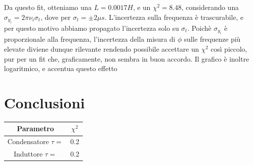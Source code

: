 Da questo fit, otteniamo una $L=0.0017 H$, e un $\chi^2 = 8.48 $, considerando una $\sigma_{y_i} = 2 \pi \nu_i \sigma_{t}$, dove  per $\sigma_t = \pm 2 \mu s$. L'incertezza sulla frequenza è trascurabile, e per questo motivo abbiamo propagato l'incertezza solo su $\sigma_t$. Poichè $\sigma_{y_i}$ è proporzionale alla frequenza, l'incertezza della misura di $\phi$ sulle frequenze più elevate diviene dunque rilevante rendendo possibile accettare un $\chi^2$ così piccolo, pur per un fit che, graficamente, non sembra in buon accordo. Il grafico è inoltre logaritmico, e accentua questo effetto
 

\section{Conclusioni}


\begin{center}
\begin{tabular}{*{2}{c}}
Parametro & $\chi^2$ \\
\midrule
Condensatore $\tau =$ & 0.2 \\
Induttore $\tau =$ & 0.2 \\

\end{tabular}
\end{center}

